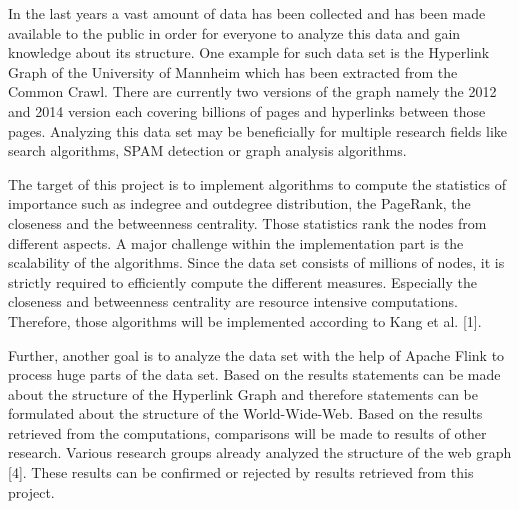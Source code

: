 In the last years a vast amount of data has been collected and has been made available to the public in order for everyone to analyze this data and gain knowledge about its structure. One example for such data set is the Hyperlink Graph of the University of Mannheim which has been extracted from the Common Crawl. There are currently two versions of the graph namely the 2012 and 2014 version each covering billions of pages and hyperlinks between those pages. Analyzing this data set may be beneficially for multiple research fields like  search algorithms, SPAM detection or graph analysis algorithms.  
 
The target of this project is to implement algorithms to compute the statistics of importance such as indegree and outdegree distribution, the PageRank, the closeness and the betweenness centrality. Those statistics rank the nodes from different aspects. A major challenge within the implementation part is the scalability of the algorithms. Since the data set consists of millions of nodes, it is strictly required to efficiently compute the different measures. Especially the closeness and betweenness centrality are resource intensive computations. Therefore, those algorithms will be implemented according to Kang et al. [1].

Further, another goal is to analyze the data set with the help of Apache Flink to process huge parts of the data set. Based on the results statements can be made about the structure of the Hyperlink Graph and therefore statements can be formulated about the structure of the World-Wide-Web. Based on the results retrieved from the computations, comparisons will be made to results of other research. Various research groups already analyzed the structure of the web graph [4]. These results can be confirmed or rejected by results retrieved from this project.